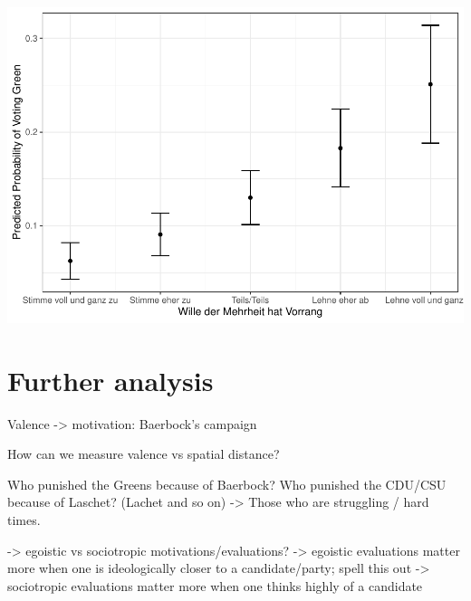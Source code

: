 \documentclass[
]{article}
\begin{document}
\includegraphics{AVCD_Final_Assignment-Edenhofer_files/figure-latex/gruene-majority-will-1.pdf}

\hypertarget{further-analysis}{%
\section{Further analysis}\label{further-analysis}}

Valence -\textgreater{} motivation: Baerbock's campaign

How can we measure valence vs spatial distance?

Who punished the Greens because of Baerbock? Who punished the CDU/CSU
because of Laschet? (Lachet and so on) -\textgreater{} Those who are
struggling / hard times.

-\textgreater{} egoistic vs sociotropic motivations/evaluations?
-\textgreater{} egoistic evaluations matter more when one is
ideologically closer to a candidate/party; spell this out
-\textgreater{} sociotropic evaluations matter more when one thinks
highly of a candidate
\end{document}
